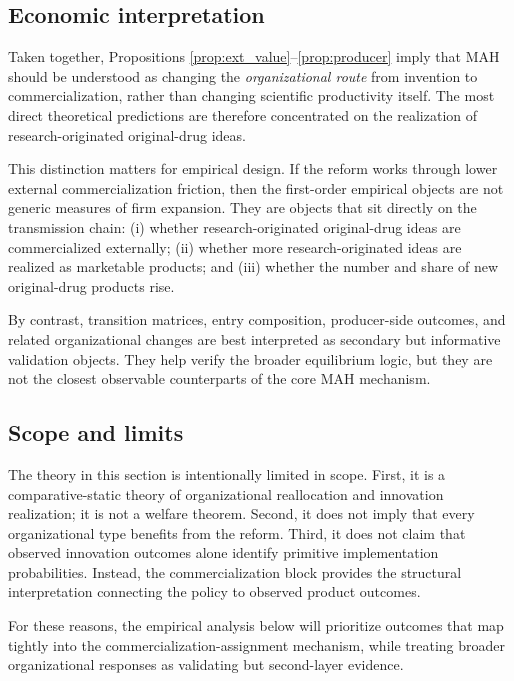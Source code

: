 \documentclass[12pt]{article}
\begin{document}
\subsection{Economic interpretation}

Taken together, Propositions \ref{prop:ext_value}--\ref{prop:producer} imply that MAH should be understood as changing the \emph{organizational route} from invention to commercialization, rather than changing scientific productivity itself. The most direct theoretical predictions are therefore concentrated on the realization of research-originated original-drug ideas.

This distinction matters for empirical design. If the reform works through lower external commercialization friction, then the first-order empirical objects are not generic measures of firm expansion. They are objects that sit directly on the transmission chain:
(i) whether research-originated original-drug ideas are commercialized externally;
(ii) whether more research-originated ideas are realized as marketable products; and
(iii) whether the number and share of new original-drug products rise.

By contrast, transition matrices, entry composition, producer-side outcomes, and related organizational changes are best interpreted as secondary but informative validation objects. They help verify the broader equilibrium logic, but they are not the closest observable counterparts of the core MAH mechanism.

\subsection{Scope and limits}

The theory in this section is intentionally limited in scope. First, it is a comparative-static theory of organizational reallocation and innovation realization; it is not a welfare theorem. Second, it does not imply that every organizational type benefits from the reform. Third, it does not claim that observed innovation outcomes alone identify primitive implementation probabilities. Instead, the commercialization block provides the structural interpretation connecting the policy to observed product outcomes.

For these reasons, the empirical analysis below will prioritize outcomes that map tightly into the commercialization-assignment mechanism, while treating broader organizational responses as validating but second-layer evidence.
\end{document}
